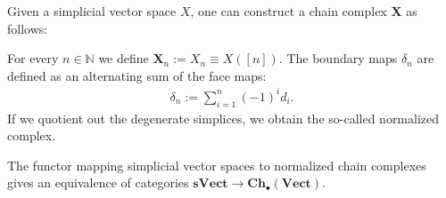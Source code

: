     Given a simplicial vector space $X$, one can construct a chain complex $\mathbf{X}$ as follows:
    \begin{construct}
        For every $n\in\mathbb{N}$ we define $\mathbf{X}_n := X_n \equiv X([n])$. The boundary maps $\delta_n$ are defined as an alternating sum of the face maps:
        \begin{gather}
            \delta_n := \sum_{i=1}^n(-1)^id_i.
        \end{gather}
        If we quotient out the degenerate simplices, we obtain the so-called normalized complex.
    \end{construct}
    \begin{theorem}\label{sheaf:dold_kan}
        The functor mapping simplicial vector spaces to normalized chain complexes gives an equivalence of categories $\mathbf{sVect}\rightarrow\mathbf{Ch}_\bullet(\mathbf{Vect})$.
    \end{theorem}